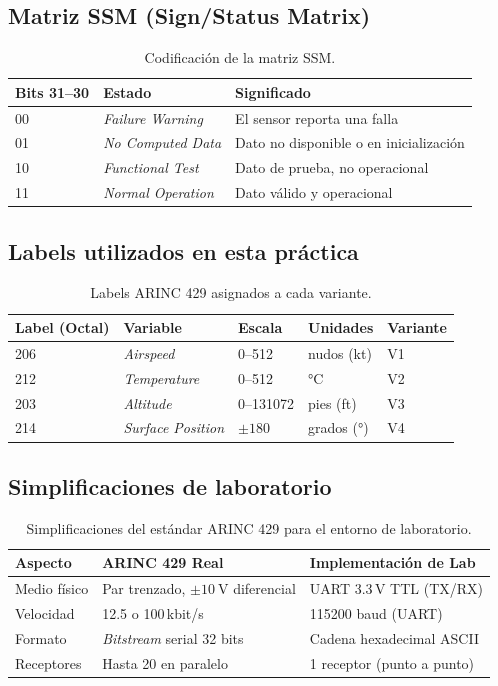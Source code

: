 \documentclass[11pt]{article}
\begin{document}
\subsection{Matriz SSM (Sign/Status Matrix)}
\begin{table}[H]\centering
\caption{Codificación de la matriz SSM.}
\begin{tabular}{lll}
\toprule
Bits 31--30 & Estado & Significado \\
\midrule
00 & \emph{Failure Warning} & El sensor reporta una falla \\
01 & \emph{No Computed Data} & Dato no disponible o en inicialización \\
10 & \emph{Functional Test} & Dato de prueba, no operacional \\
11 & \emph{Normal Operation} & Dato válido y operacional \\
\bottomrule
\end{tabular}
\end{table}

\subsection{Labels utilizados en esta práctica}
\begin{table}[H]\centering
\caption{Labels ARINC 429 asignados a cada variante.}
\begin{tabular}{lllll}
\toprule
Label (Octal) & Variable & Escala & Unidades & Variante \\
\midrule
206 & \emph{Airspeed} & 0--512 & nudos (kt) & V1 \\
212 & \emph{Temperature} & 0--512 & \si{\celsius} & V2 \\
203 & \emph{Altitude} & 0--131072 & pies (ft) & V3 \\
214 & \emph{Surface Position} & $\pm 180$ & grados ($\si{\degree}$) & V4 \\
\bottomrule
\end{tabular}
\end{table}

\subsection{Simplificaciones de laboratorio}
\begin{table}[H]\centering
\caption{Simplificaciones del estándar ARINC 429 para el entorno de laboratorio.}
\begin{tabular}{lll}
\toprule
Aspecto & ARINC 429 Real & Implementación de Lab \\
\midrule
Medio físico & Par trenzado, $\pm\SI{10}{\volt}$ diferencial & UART 3.3\,V TTL (TX/RX) \\
Velocidad & 12.5 o 100\,kbit/s & 115200 baud (UART) \\
Formato & \emph{Bitstream} serial 32 bits & Cadena hexadecimal ASCII \\
Receptores & Hasta 20 en paralelo & 1 receptor (punto a punto) \\
\bottomrule
\end{tabular}
\end{table}
\end{document}
